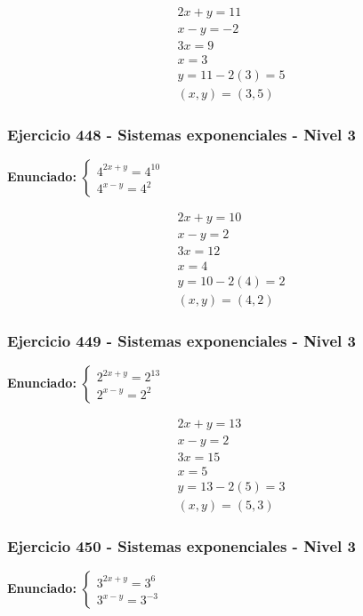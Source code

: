 \documentclass[12pt,a4paper]{article}
\begin{document}
\[
\begin{aligned}
2x+y=11\\
x-y=-2\\
3x=9\\
x=3\\
y=11-2(3)=5\\
\boxed{(x,y)=(3,5)}
\end{aligned}
\]


\subsubsection*{Ejercicio 448 - Sistemas exponenciales - Nivel 3}
\textbf{Enunciado:} \(\begin{cases} 4^{2x+y}=4^{10}\\ 4^{x-y}=4^{2}\end{cases}\)

\[
\begin{aligned}
2x+y=10\\
x-y=2\\
3x=12\\
x=4\\
y=10-2(4)=2\\
\boxed{(x,y)=(4,2)}
\end{aligned}
\]


\subsubsection*{Ejercicio 449 - Sistemas exponenciales - Nivel 3}
\textbf{Enunciado:} \(\begin{cases} 2^{2x+y}=2^{13}\\ 2^{x-y}=2^{2}\end{cases}\)

\[
\begin{aligned}
2x+y=13\\
x-y=2\\
3x=15\\
x=5\\
y=13-2(5)=3\\
\boxed{(x,y)=(5,3)}
\end{aligned}
\]


\subsubsection*{Ejercicio 450 - Sistemas exponenciales - Nivel 3}
\textbf{Enunciado:} \(\begin{cases} 3^{2x+y}=3^{6}\\ 3^{x-y}=3^{-3}\end{cases}\)
\end{document}

